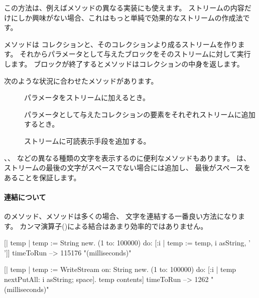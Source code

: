 \documentclass[a4paper,10pt,twoside]{book}
\begin{document}
この方法は、例えばメソッドの異なる実装にも使えます。
ストリームの内容だけにしか興味がない場合、これはもっと単純で効果的なストリームの作成法です。


 メソッドは
コレクションと、そのコレクションより成るストリームを作ります。
それからパラメータとして与えたブロックをそのストリームに対して実行します。
ブロックが終了するとメソッドはコレクションの中身を返します。

次のような状況に合わせたメソッドがあります。

\begin{description}
\item[] パラメータをストリームに加えるとき。
\item[] パラメータとして与えたコレクションの要素をそれぞれストリームに追加するとき。
\item[] ストリームに可読表示手段を追加する。
\end{description}

、、 
などの異なる種類の文字を表示するのに便利なメソッドもあります。
は、ストリームの最後の文字がスペースでない場合には追加し、
最後がスペースをあることを保証します。

\paragraph{連結について}

のメソッド、メソッドは多くの場合、
文字を連結する一番良い方法になります。
カンマ演算子(\ct{,})による結合はあまり効率的ではありません。


\begin{code}{}
[| temp |
  temp := String new.
  (1 to: 100000)
    do: [:i | temp := temp, i asString, ' ']] timeToRun --> 115176 "(milliseconds)"

[| temp |
  temp := WriteStream on: String new.
  (1 to: 100000)
    do: [:i | temp nextPutAll: i asString; space].
  temp contents] timeToRun --> 1262 "(milliseconds)"
\end{code}
\end{document}
